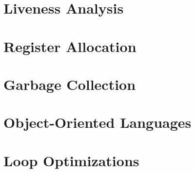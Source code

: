 \documentclass[UTF8, 10pt]{ctexart}
\begin{document}
\begin{multicols}{2}
\section{Liveness Analysis}
\label{section:liveness-analysis}

\section{Register Allocation}
\label{section:register-allocation}

\section{Garbage Collection}
\label{section:garbage-collection}

\section{Object-Oriented Languages}
\label{section:object-oriented-languages}

\section{Loop Optimizations}
\label{section:loop-optimizations}

\end{multicols}
\end{document}
